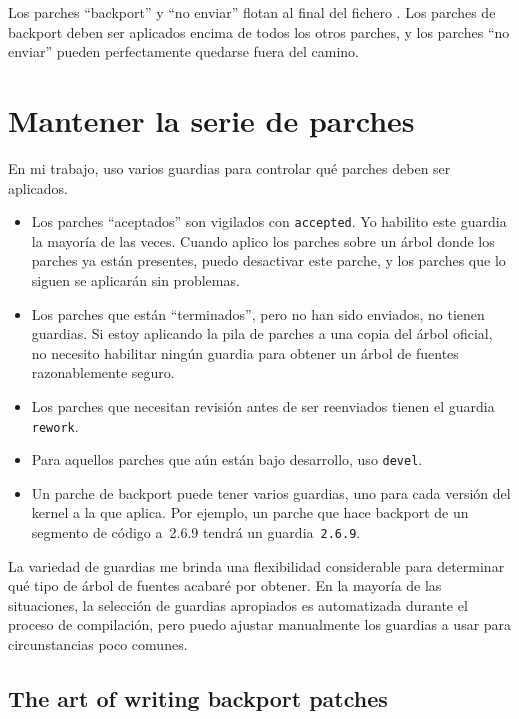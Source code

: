 Los parches ``backport'' y ``no enviar'' flotan al final del fichero
. Los parches de backport deben ser aplicados encima
de todos los otros parches, y los parches ``no enviar'' pueden
perfectamente quedarse fuera del camino.

\section{Mantener la serie de parches}

En mi trabajo, uso varios guardias para controlar qué parches deben
ser aplicados.

\begin{itemize}
\item Los parches ``aceptados'' son vigilados con
  \texttt{accepted}. Yo habilito este guardia la mayoría de las veces.
  Cuando aplico los parches sobre un árbol donde los parches ya están
  presentes, puedo desactivar este parche, y los parches que lo siguen
  se aplicarán sin problemas.
\item Los parches que están ``terminados'', pero no han sido enviados,
  no tienen guardias. Si estoy aplicando la pila de parches a una
  copia del árbol oficial, no necesito habilitar ningún guardia para
  obtener un árbol de fuentes razonablemente seguro.
\item Los parches que necesitan revisión antes de ser reenviados
  tienen el guardia \texttt{rework}.
\item Para aquellos parches que aún están bajo desarrollo, uso
  \texttt{devel}.
\item Un parche de backport puede tener varios guardias, uno para cada
  versión del kernel a la que aplica. Por ejemplo, un parche que hace
  backport de un segmento de código a~2.6.9 tendrá un guardia~\texttt{2.6.9}.
\end{itemize}
La variedad de guardias me brinda una flexibilidad considerable para
determinar qué tipo de árbol de fuentes acabaré por obtener. En la
mayoría de las situaciones, la selección de guardias apropiados es
automatizada durante el proceso de compilación, pero puedo ajustar
manualmente los guardias a usar para circunstancias poco comunes.

\subsection{The art of writing backport patches}

